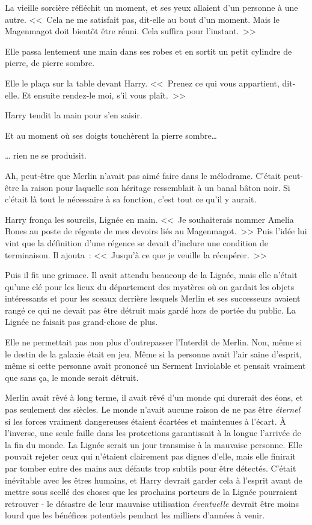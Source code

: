 La vieille sorcière réfléchit un moment, et ses yeux allaient d'un personne à une autre. <<~Cela ne me satisfait pas, dit-elle au bout d'un moment. Mais le Magenmagot doit bientôt être réuni. Cela suffira pour l'instant.~>>

Elle passa lentement une main dans ses robes et en sortit un petit cylindre de pierre, de pierre sombre.

Elle le plaça sur la table devant Harry. <<~Prenez ce qui vous appartient, dit-elle. Et ensuite rendez-le moi, s'il vous plaît.~>>

Harry tendit la main pour s'en saisir.

Et au moment où ses doigts touchèrent la pierre sombre…

… rien ne se produisit.

Ah, peut-être que Merlin n'avait pas aimé faire dans le mélodrame. C'était peut-être la raison pour laquelle son héritage ressemblait à un banal bâton noir. Si c'était là tout le nécessaire à sa fonction, c'est tout ce qu'il y aurait.

Harry fronça les sourcils, Lignée en main. <<~Je souhaiterais nommer Amelia Bones au poste de régente de mes devoirs liés au Magenmagot.~>> Puis l'idée lui vint que la définition d'une régence se devait d'inclure une condition de terminaison. Il ajouta~: <<~Jusqu'à ce que je veuille la récupérer.~>>

Puis il fit une grimace. Il avait attendu beaucoup de la Lignée, mais elle n'était qu'une clé pour les lieux du département des mystères où on gardait les objets intéressants et pour les sceaux derrière lesquels Merlin et ses successeurs avaient rangé ce qui ne devait pas être détruit mais gardé hors de portée du public. La Lignée ne faisait pas grand-chose de plus.

Elle ne permettait pas non plus d'outrepasser l'Interdit de Merlin. Non, même si le destin de la galaxie était en jeu. Même si la personne avait l'air saine d'esprit, même si cette personne avait prononcé un Serment Inviolable et pensait vraiment que sans ça, le monde serait détruit.

Merlin avait rêvé à long terme, il avait rêvé d'un monde qui durerait des éons, et pas seulement des siècles. Le monde n'avait aucune raison de ne pas être \emph{éternel} si les forces vraiment dangereuses étaient écartées et maintenues à l'écart. À l'inverse, une seule faille dans les protections garantissait à la longue l'arrivée de la fin du monde. La Lignée serait un jour transmise à la mauvaise personne. Elle pouvait rejeter ceux qui n'étaient clairement pas dignes d'elle, mais elle finirait par tomber entre des mains aux défauts trop subtils pour être détectés. C'était inévitable avec les êtres humains, et Harry devrait garder cela à l'esprit avant de mettre sous scellé des choses que les prochains porteurs de la Lignée pourraient retrouver - le désastre de leur mauvaise utilisation \emph{éventuelle} devrait être moins lourd que les bénéfices potentiels pendant les milliers d'années à venir.

